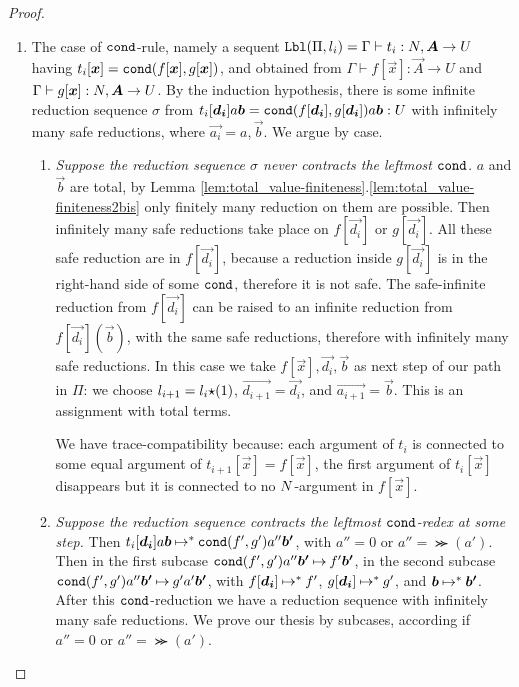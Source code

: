 \begin{proof}
\begin{enumerate}

\item
  The case of ${\tt cond}$-rule, namely a sequent
  $\Label(\Pi,l_i) = \Gamma\vdash t_i:\N,\vec{A}\rightarrow U$
  having $t_i[\vec{x}] = \cond(f[\vec{x}],g[\vec{x}])$,
  and obtained from 
  $\Gamma\vdash f[\vec{x}]:\vec{A}\rightarrow U$
  and
  $\Gamma\vdash g[\vec{x}]:\N,\vec{A}\rightarrow U$. 
  By the induction hypothesis, there is some infinite reduction sequence $\sigma$ from
  $t_i[\vec{d_i}]a \vec{b} = \cond(f[\vec{d_i}],g[\vec{d_i}])a\vec{b}: U$
  with infinitely many safe reductions,
  where $\vec{a_i} = a,\vec{b}$. 
  We argue by case.

\begin{enumerate}
\item
  \emph{Suppose the reduction sequence $\sigma$ never contracts the leftmost ${\tt cond}$.}
  $a$ and $\vec{b}$ are total, 
  by Lemma \ref{lem:total_value-finiteness}.\ref{lem:total_value-finiteness2bis}
  only finitely many reduction on them are possible.
  Then infinitely many safe reductions take place on $f[\vec{d_i}]$ or $g[\vec{d_i}]$. 
  All these safe reduction are in $f[\vec{d_i}]$, because
  a reduction inside $g[\vec{d_i}]$ is in the right-hand side of some ${\tt cond}$, 
  therefore it is not safe.
  The safe-infinite reduction from $f[\vec{d_i}]$ can be raised to an infinite reduction from 
  $f[\vec{d_i}](\vec{b})$, with the same safe reductions, therefore with infinitely
  many safe reductions.
  In this case we take $f[\vec{x}],\vec{d_i},\vec{b}$ as next step of our path in $\Pi$:
  we choose $l_{i+1} = l_i {\star} (1)$, $\vec{d_{i+1}} = \vec{d_i}$, and
  $\vec{a_{i+1}} = \vec{b}$.  This is an assignment with total terms.

  We have trace-compatibility because: 
  each argument of $t_i$ is connected to some equal argument of 
  $t_{i+1}[\vec{x}]=f[\vec{x}]$,
  the first argument of $t_i[\vec{x}]$ disappears 
  but it is connected to no ${N}$-argument in $f[\vec{x}]$.

\item
  \emph{Suppose the reduction sequence contracts the leftmost ${\tt cond}$-redex at some step.}
  Then $t_i[\vec{d_i}]a \vec{b} \reduces^{*} \cond(f',g')a''\vec{b'}$, 
  with $a'' = 0$ or $a'' = \Succ(a')$. 
  Then in the first subcase $\cond(f',g')a''\vec{b'} \reduces f'\vec{b'}$, in the second subcase
  $\cond(f',g')a''\vec{b'} \reduces g' a' \vec{b'}$, 
  with $f[\vec{d_i}] \reduces^{*} f'$, $g[\vec{d_i}] \reduces^{*} g'$, 
  and $\vec{b} \reduces^{*} \vec{b'}$.
  After this ${\tt cond}$-reduction we have a reduction sequence 
  with infinitely many safe reductions.
  We prove our thesis by subcases, according if $a'' = 0$ or $a'' = \Succ(a')$.
   

\end{enumerate}
\end{enumerate}
\end{proof}
